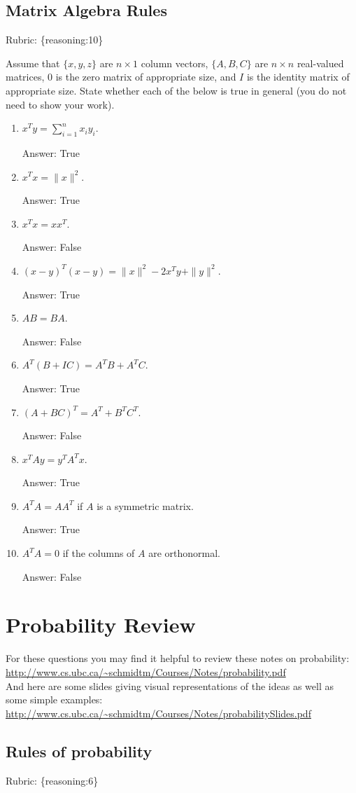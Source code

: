 \documentclass{article}
\def\rubric#1{\gre{Rubric: \{#1\}}}{}
\def\ans#1{\par\gre{Answer: #1}}
\def\blu#1{{\color{blu}#1}}
\def\gre#1{{\color{gre}#1}}
\def\red#1{{\color{red}#1}}
\def\norm#1{\|#1\|}
\begin{document}
\subsection{Matrix Algebra Rules}
\rubric{reasoning:10}

Assume that $\{x,y,z\}$ are $n \times 1$ column vectors, $\{A,B,C\}$ are $n \times n$ real-valued matrices, \red{$0$ is the zero matrix of appropriate size}, and $I$ is the identity matrix of appropriate size. \blu{State whether each of the below is true in general} (you do not need to show your work).

\begin{enumerate}
\item $x^Ty = \sum_{i=1}^n x_iy_i$.
\ans{True}
\item $x^Tx = \norm{x}^2$.
\ans{True}
\item $x^Tx = xx^T$.
\ans{False}
\item $(x-y)^T(x-y) = \norm{x}^2 - 2x^Ty + \norm{y}^2$.
\ans{True}
\item $AB=BA$.
\ans{False}
\item $A^T(B + IC) = A^TB + A^TC$.
\ans{True}
\item $(A + BC)^T = A^T + B^TC^T$.
\ans{False}
\item $x^TAy = y^TA^Tx$.
\ans{True}
\item $A^TA = AA^T$ if $A$ is a symmetric matrix.
\ans{True}
\item $A^TA = 0$ if the columns of $A$ are orthonormal.
\ans{False}
\end{enumerate}

\section{Probability Review}


For these questions you may find it helpful to review these notes on probability:\\
\url{http://www.cs.ubc.ca/~schmidtm/Courses/Notes/probability.pdf}\\
And here are some slides giving visual representations of the ideas as well as some simple examples:\\
\url{http://www.cs.ubc.ca/~schmidtm/Courses/Notes/probabilitySlides.pdf}

\subsection{Rules of probability}
\rubric{reasoning:6}
\end{document}
